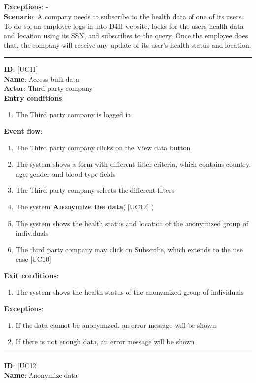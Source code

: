 \documentclass[a4paper, hidelinks, 12pt]{report}
\newcommand\usecase[1]{ [UC#1] }
\begin{document}
\begin{itemize}
\begin{enumerate}
		\end{enumerate}
		\textbf{Exceptions}:  - \\
		\textbf{Scenario}: A company needs to subscribe to the health data of one of its users. To do so, an employee logs in into D4H website, looks for the users health data and location using its SSN, and subscribes to the query. Once the employee does that, the company will receive any update of its user's health status and location.
		\rule{\linewidth}{0.4pt}
		\textbf{ID}: \usecase{11} \\
		\textbf{Name}: Access bulk data \\
		\textbf{Actor}: Third party company \\
		\textbf{Entry conditions}:
		\begin{enumerate}
			\item{The Third party company is logged in}
		\end{enumerate}
		\textbf{Event flow}:
		\begin{enumerate}
			\item{The Third party company clicks on the View data button}
			\item{The system shows a form with different filter criteria, which contains country, age, gender and blood type fields}
			\item{The Third party company selects the different filters}
			\item{The system \textbf{Anonymize the data}(\usecase{12})}
			\item{The system shows the health status and location of the anonymized group of individuals}
			\item{The third party company may click on Subscribe, which extends to the use case \usecase{10}}
		\end{enumerate}
		\textbf{Exit conditions}:
		\begin{enumerate}
			\item{The system shows the health status of the anonymized group of individuals}
		\end{enumerate}
		\textbf{Exceptions}:
		\begin{enumerate}
			\item{If the data cannot be anonymized, an error message will be shown}
			\item{If there is not enough data, an error message will be shown}
		\end{enumerate}
		\rule{\linewidth}{0.4pt}
		\textbf{ID}: \usecase{12} \\
		\textbf{Name}: Anonymize data \\

\end{itemize}
\end{document}
